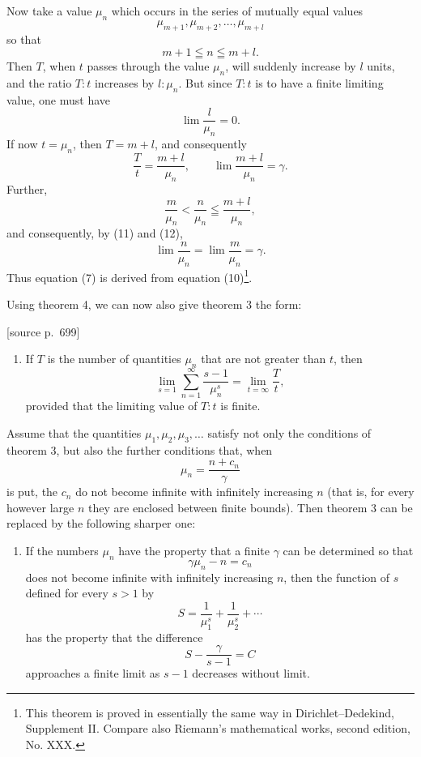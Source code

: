 \documentclass[11pt]{article}
\newcommand{\srcpage}[1]{\par\medskip\noindent\textsf{[source p.~#1]}\par\smallskip}
\begin{document}
Now take a value $\mu_n$ which occurs in the series of mutually equal values
\[
\mu_{m+1},\mu_{m+2},\ldots,\mu_{m+l}
\]
so that
\[
m+1\leqq n\leqq m+l.
\]
Then $T$, when $t$ passes through the value $\mu_n$, will suddenly increase by $l$ units, and the ratio $T:t$ increases by $l:\mu_n$. But since $T:t$ is to have a finite limiting value, one must have
\begin{equation}
\lim\frac{l}{\mu_n}=0.
\tag{11}
\end{equation}
If now $t=\mu_n$, then $T=m+l$, and consequently
\begin{equation}
\frac{T}{t}=\frac{m+l}{\mu_n},\qquad
\lim\frac{m+l}{\mu_n}=\gamma.
\tag{12}
\end{equation}
Further,
\[
\frac{m}{\mu_n}<\frac{n}{\mu_n}\leqq\frac{m+l}{\mu_n},
\]
and consequently, by (11) and (12),
\[
\lim\frac{n}{\mu_n}=\lim\frac{m}{\mu_n}=\gamma.
\]
Thus equation (7) is derived from equation (10)\footnote{This theorem is proved in essentially the same way in Dirichlet--Dedekind, Supplement II. Compare also Riemann's mathematical works, second edition, No. XXX.}.

Using theorem 4, we can now also give theorem 3 the form:

\srcpage{699}
\begin{enumerate}[label=\textbf{\arabic*.},leftmargin=2.2em,start=5]
\item If $T$ is the number of quantities $\mu_n$ that are not greater than $t$, then
\begin{equation}
\lim_{s=1}\sum_{n=1}^{\infty}\frac{s-1}{\mu_n^s}=\lim_{t=\infty}\frac{T}{t},
\tag{13}
\end{equation}
provided that the limiting value of $T:t$ is finite.
\end{enumerate}

Assume that the quantities $\mu_1,\mu_2,\mu_3,\ldots$ satisfy not only the conditions of theorem 3, but also the further conditions that, when
\begin{equation}
\mu_n=\frac{n+c_n}{\gamma}
\tag{14}
\end{equation}
is put, the $c_n$ do not become infinite with infinitely increasing $n$ (that is, for every however large $n$ they are enclosed between finite bounds). Then theorem 3 can be replaced by the following sharper one:

\begin{enumerate}[label=\textbf{\arabic*.},leftmargin=2.2em,start=6]
\item If the numbers $\mu_n$ have the property that a finite $\gamma$ can be determined so that
\begin{equation}
\gamma\mu_n-n=c_n
\tag{15}
\end{equation}
does not become infinite with infinitely increasing $n$, then the function of $s$ defined for every $s>1$ by
\begin{equation}
S=\frac1{\mu_1^s}+\frac1{\mu_2^s}+\cdots
\tag{16}
\end{equation}
has the property that the difference
\begin{equation}
S-\frac{\gamma}{s-1}=C
\tag{17}
\end{equation}
approaches a finite limit as $s-1$ decreases without limit.
\end{enumerate}
\end{document}
